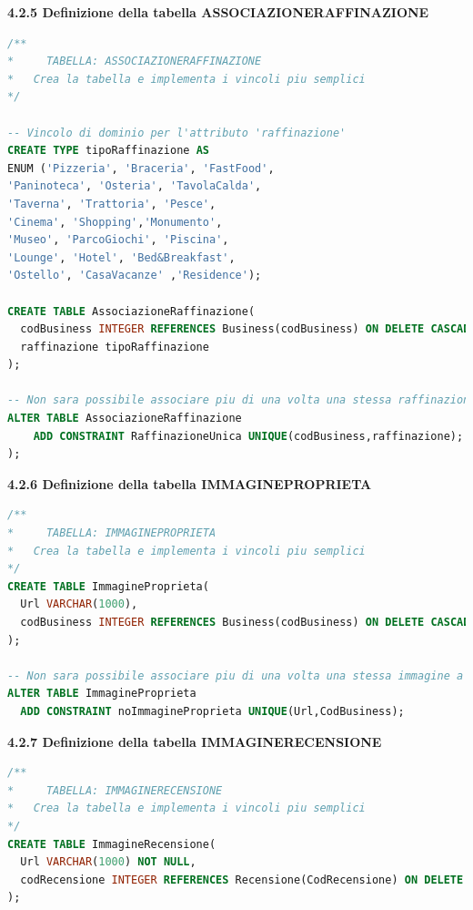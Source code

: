 \documentclass[a4paper,12pt]{article}
\begin{document}
\newpage\null{}\setcounter{page}{15}
\vspace{-2cm}
{\flushleft \bf 4.2.5  Definizione della tabella ASSOCIAZIONERAFFINAZIONE}
\begin{lstlisting}[language=SQL]
/**
*	  TABELLA: ASSOCIAZIONERAFFINAZIONE
*   Crea la tabella e implementa i vincoli piu semplici
*/

-- Vincolo di dominio per l'attributo 'raffinazione'
CREATE TYPE tipoRaffinazione AS 
ENUM ('Pizzeria', 'Braceria', 'FastFood',
'Paninoteca', 'Osteria', 'TavolaCalda',
'Taverna', 'Trattoria', 'Pesce',
'Cinema', 'Shopping','Monumento',
'Museo', 'ParcoGiochi', 'Piscina',
'Lounge', 'Hotel', 'Bed&Breakfast',
'Ostello', 'CasaVacanze' ,'Residence');

CREATE TABLE AssociazioneRaffinazione(
  codBusiness INTEGER REFERENCES Business(codBusiness) ON DELETE CASCADE,
  raffinazione tipoRaffinazione
);

-- Non sara possibile associare piu di una volta una stessa raffinazione a un business
ALTER TABLE AssociazioneRaffinazione
	ADD CONSTRAINT RaffinazioneUnica UNIQUE(codBusiness,raffinazione);
);
\end{lstlisting}

\vspace*{+1cm}

{\flushleft \bf 4.2.6  Definizione della tabella IMMAGINEPROPRIETA}
\begin{lstlisting}[language=SQL]
/**
*	  TABELLA: IMMAGINEPROPRIETA
*   Crea la tabella e implementa i vincoli piu semplici
*/
CREATE TABLE ImmagineProprieta(
  Url VARCHAR(1000),
  codBusiness INTEGER REFERENCES Business(codBusiness) ON DELETE CASCADE
);

-- Non sara possibile associare piu di una volta una stessa immagine a un business
ALTER TABLE ImmagineProprieta
  ADD CONSTRAINT noImmagineProprieta UNIQUE(Url,CodBusiness);
\end{lstlisting}

\vspace*{+1cm}

{\flushleft \bf 4.2.7  Definizione della tabella IMMAGINERECENSIONE}
\begin{lstlisting}[language=SQL]
/**
*	  TABELLA: IMMAGINERECENSIONE
*   Crea la tabella e implementa i vincoli piu semplici
*/
CREATE TABLE ImmagineRecensione(
  Url VARCHAR(1000) NOT NULL,
  codRecensione INTEGER REFERENCES Recensione(CodRecensione) ON DELETE CASCADE
);
\end{lstlisting}
\newpage
\end{document}
